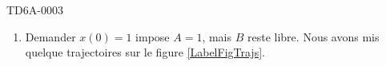 \begin{corrige}{TD6A-0003}
\begin{enumerate}
        \item

            Demander \( x(0)=1\) impose \( A=1\), mais \( B\) reste libre. Nous avons mis quelque trajectoires sur le figure \ref{LabelFigTrajs}.
            \newcommand{\CaptionFigTrajs}{Les trajectoires sont tracées pour \( t\) entre \( 0\) et \( 1\). Les points correspondent à \( t=0\). La courbe rouge correspond à \( B=-1\). Nous voyons qu'elle est sur la même trajectoire que \( B=1\), mais elle ne part pas du même point.}
            

    \end{enumerate}
    

\end{corrige}
